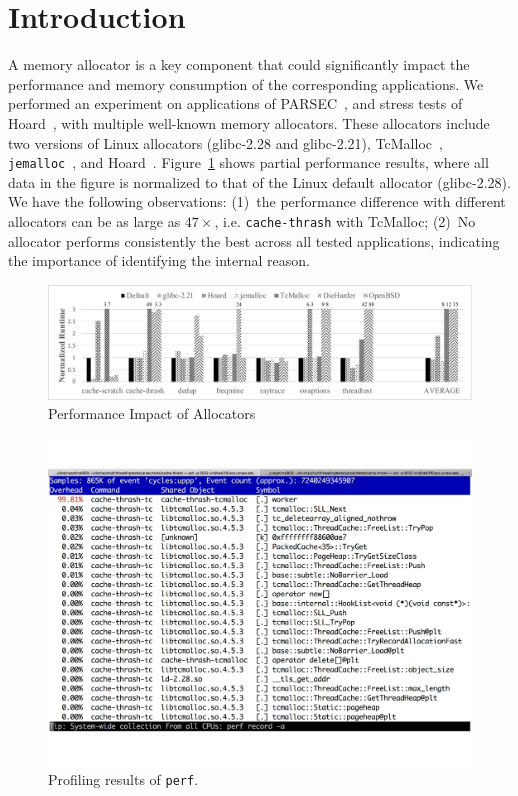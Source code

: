 

\section{Introduction}

A memory allocator is a key component that could significantly impact the performance and memory consumption of the corresponding applications. We performed an experiment on applications of PARSEC~\cite{parsec}, and stress tests of Hoard~\cite{Hoard}, with multiple well-known memory allocators. These allocators include two versions of Linux allocators (glibc-2.28 and glibc-2.21), TcMalloc~\cite{tcmalloc}, \texttt{jemalloc}~\cite{jemalloc}, and Hoard~\cite{Hoard}. Figure~\ref{fig:motivation} shows partial performance results, where all data in the figure is normalized to that of the Linux default allocator (glibc-2.28). We have the following observations: (1)~the performance difference with different allocators can be as large as $47\times$, i.e. \texttt{cache-thrash} with TcMalloc; (2)~No allocator performs consistently the best across all tested applications, indicating the importance of identifying the internal reason.

\begin{figure}[!ht]
\centering
\includegraphics[width=0.9\columnwidth]{figures/regular-performance}
\caption{Performance Impact of Allocators\label{fig:motivation}}
\end{figure}

\begin{figure}[!ht]
\centering
\includegraphics[width=0.9\columnwidth]{figures/perf-cache-thrash-tcmalloc}
\caption{Profiling results of \texttt{perf}. \label{fig:mot1}}
\end{figure}


